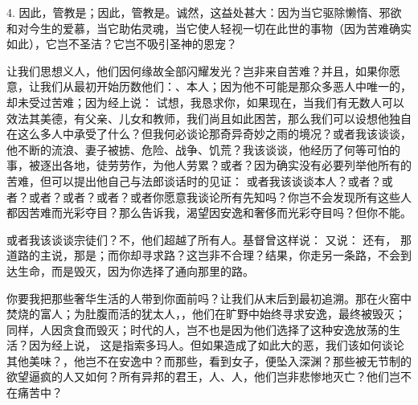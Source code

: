 4. 因此，管教是；因此，管教是。诚然，这益处甚大：因为当它驱除懒惰、邪欲和对今生的爱慕，当它助佑灵魂，当它使人轻视一切在此世的事物（因为苦难确实如此），它岂不圣洁？它岂不吸引圣神的恩宠？\par

让我们思想义人，他们因何缘故全部闪耀发光？岂非来自苦难？并且，如果你愿意，让我们从最初开始历数他们：、本人；因为他不可能是那众多恶人中唯一的，却未受过苦难；因为经上说： 试想，我恳求你，如果现在，当我们有无数人可以效法其美德，有父亲、儿女和教师，我们尚且如此困苦，那么我们可以设想他独自在这么多人中承受了什么？但我何必谈论那奇异奇妙之雨的境况？或者我该谈谈，他不断的流浪、妻子被掳、危险、战争、饥荒？我该谈谈，他经历了何等可怕的事，被逐出各地，徒劳劳作，为他人劳累？或者？因为确实没有必要列举他所有的苦难，但可以提出他自己与法郎谈话时的见证： 或者我该谈谈本人？或者？或者？或者？或者？或者？或者你愿意我谈论所有先知吗？你岂不会发现所有这些人都因苦难而光彩夺目？那么告诉我，渴望因安逸和奢侈而光彩夺目吗？但你不能。\par

或者我该谈谈宗徒们？不，他们超越了所有人。基督曾这样说： 又说： 还有， 那道路的主说，那是；而你却寻求路？这岂非不合理？结果，你走另一条路，不会到达生命，而是毁灭，因为你选择了通向那里的路。\par

你要我把那些奢华生活的人带到你面前吗？让我们从末后到最初追溯。那在火窑中焚烧的富人；为肚腹而活的犹太人，，他们在旷野中始终寻求安逸，最终被毁灭；同样，人因贪食而毁灭；时代的人，岂不也是因为他们选择了这种安逸放荡的生活？因为经上说， 这是指索多玛人。但如果造成了如此大的恶，我们该如何谈论其他美味？，他岂不在安逸中？而那些，看到女子，便坠入深渊？那些被无节制的欲望逼疯的人又如何？所有异邦的君王，人、人，他们岂非悲惨地灭亡？他们岂不在痛苦中？\par

